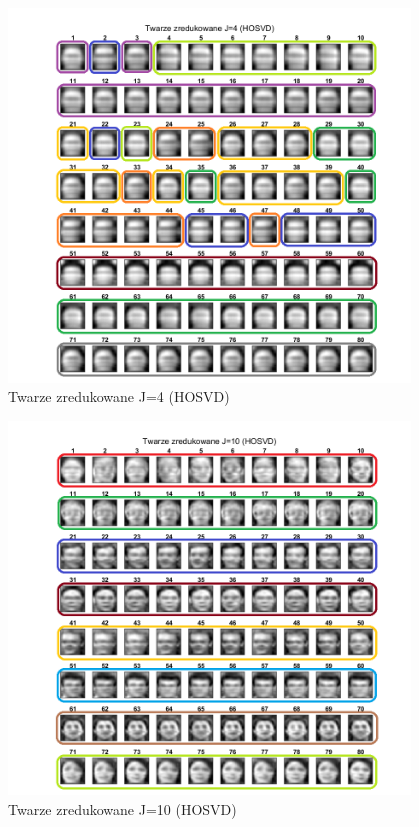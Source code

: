 \documentclass[11pt, a4paper]{article}
\begin{document}
\begin{figure}[H]
	\centering
	\includegraphics[width=0.95\textwidth]{./assets/rezultat_HOSVD_j4.png}
	\caption{Twarze zredukowane J=4 (HOSVD)}
	\label{fig:rezultat_HOSVD_j4}
\end{figure}

\begin{figure}[H]
	\centering
	\includegraphics[width=0.95\textwidth]{./assets/rezultat_HOSVD_j10.png}
	\caption{Twarze zredukowane J=10 (HOSVD)}
	\label{fig:rezultat_HOSVD_j10}
\end{figure}
\end{document}
